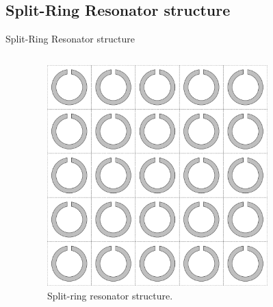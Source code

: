 \subsection{Split-Ring Resonator structure}

\begin{frame}{Split-Ring Resonator structure}
    \begin{columns}
        \cite{798002}
        \begin{figure}
            \centering
            \includegraphics[width=0.8\textwidth]{Figures/SSR_structure.pdf}
            \caption{Split-ring resonator structure.}
            \label{fig:SSR_structure}
        \end{figure}

        

\end{columns}
\end{frame}

